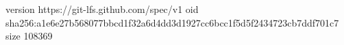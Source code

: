 version https://git-lfs.github.com/spec/v1
oid sha256:a1e6e27b568077bbcd1f32a6d4dd3d1927cc6bcc1f5d5f2434723cb7ddf701c7
size 108369
